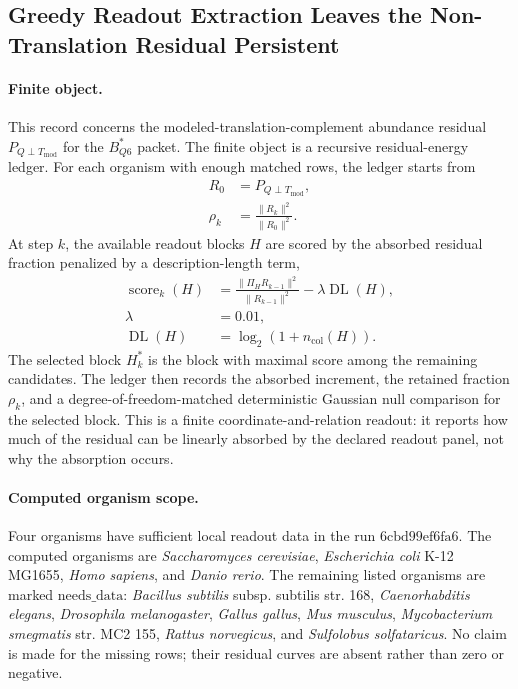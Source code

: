 \subsection{Greedy Readout Extraction Leaves the Non-Translation Residual Persistent}
\label{sec:q6-residual-basis-extraction-greedy-readout-cross-layer}

\paragraph{Finite object.}
This record concerns the modeled-translation-complement abundance residual $P_{Q\perp T_{\mathrm{mod}}}$ for the $B^*_{Q6}$ packet.  The finite object is a recursive residual-energy ledger.  For each organism with enough matched rows, the ledger starts from
$$
\begin{aligned}
R_0 &= P_{Q\perp T_{\mathrm{mod}}},\\
\rho_k &= \frac{\|R_k\|^2}{\|R_0\|^2}.
\end{aligned}
$$
At step $k$, the available readout blocks $H$ are scored by the absorbed residual fraction penalized by a description-length term,
$$
\begin{aligned}
\operatorname{score}_k(H)
  &= \frac{\|\Pi_H R_{k-1}\|^2}{\|R_{k-1}\|^2}
     - \lambda \operatorname{DL}(H),\\
\lambda &= 0.01,\\
\operatorname{DL}(H) &= \log_2(1+n_{\mathrm{col}}(H)).
\end{aligned}
$$
The selected block $H_k^*$ is the block with maximal score among the remaining candidates.  The ledger then records the absorbed increment, the retained fraction $\rho_k$, and a degree-of-freedom-matched deterministic Gaussian null comparison for the selected block.  This is a finite coordinate-and-relation readout: it reports how much of the residual can be linearly absorbed by the declared readout panel, not why the absorption occurs.

\paragraph{Computed organism scope.}
Four organisms have sufficient local readout data in the run $6\mathrm{cbd}99\mathrm{ef}6\mathrm{fa}6$.  The computed organisms are \textit{Saccharomyces cerevisiae}, \textit{Escherichia coli} K-12 MG1655, \textit{Homo sapiens}, and \textit{Danio rerio}.  The remaining listed organisms are marked $\mathrm{needs\_data}$: \textit{Bacillus subtilis} subsp. subtilis str. 168, \textit{Caenorhabditis elegans}, \textit{Drosophila melanogaster}, \textit{Gallus gallus}, \textit{Mus musculus}, \textit{Mycobacterium smegmatis} str. MC2 155, \textit{Rattus norvegicus}, and \textit{Sulfolobus solfataricus}.  No claim is made for the missing rows; their residual curves are absent rather than zero or negative.

